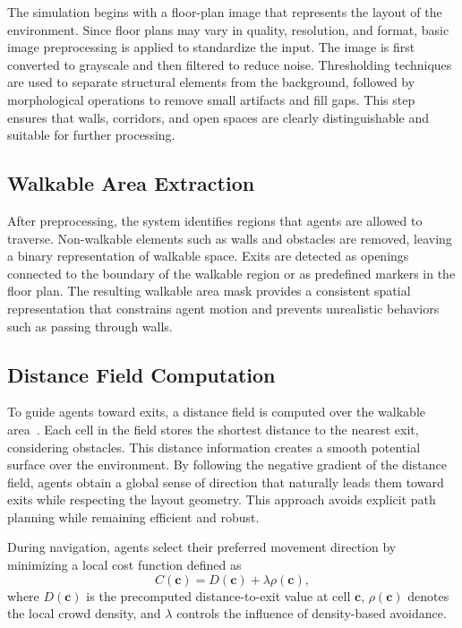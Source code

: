 \documentclass[conference]{IEEEtran}
\begin{document}
The simulation begins with a floor-plan image that represents the layout of the
environment. Since floor plans may vary in quality, resolution, and format,
basic image preprocessing is applied to standardize the input. The image is
first converted to grayscale and then filtered to reduce noise. Thresholding
techniques are used to separate structural elements from the background,
followed by morphological operations to remove small artifacts and fill gaps.
This step ensures that walls, corridors, and open spaces are clearly
distinguishable and suitable for further processing.

\subsection{\textbf{Walkable Area Extraction}}

After preprocessing, the system identifies regions that agents are allowed to
traverse. Non-walkable elements such as walls and obstacles are removed,
leaving a binary representation of walkable space. Exits are detected as
openings connected to the boundary of the walkable region or as predefined
markers in the floor plan. The resulting walkable area mask provides a
consistent spatial representation that constrains agent motion and prevents
unrealistic behaviors such as passing through walls.

\subsection{\textbf{Distance Field Computation}}

To guide agents toward exits, a distance field is computed over the walkable
area~\cite{sethian1996fast}. Each cell in the field stores the shortest
distance to the nearest exit, considering obstacles. This distance information
creates a smooth potential surface over the environment. By following the
negative gradient of the distance field, agents obtain a global sense of
direction that naturally leads them toward exits while respecting the layout
geometry. This approach avoids explicit path planning while remaining efficient
and robust.

During navigation, agents select their preferred movement direction by
minimizing a local cost function defined as
\begin{equation}
    C(\mathbf{c}) = D(\mathbf{c}) + \lambda \rho(\mathbf{c}),
\end{equation}
where $D(\mathbf{c})$ is the precomputed distance-to-exit value at cell
$\mathbf{c}$, $\rho(\mathbf{c})$ denotes the local crowd density, and
$\lambda$ controls the influence of density-based avoidance.
\end{document}
